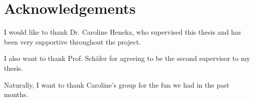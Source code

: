 \section*{Acknowledgements}

I would like to thank Dr. Caroline Heneka, who supervised this thesis and has been very supportive throughout the project.

I also want to thank Prof. Schäfer for agreeing to be the second supervisor to my thesis.

Naturally, I want to thank Caroline's group for the fun we had in the past months.